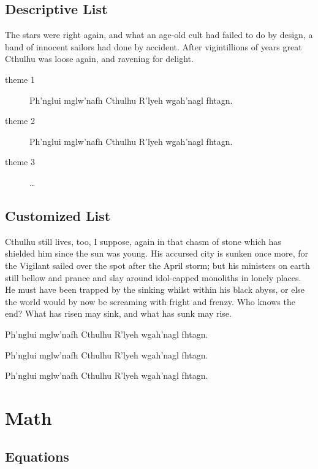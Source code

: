 \subsection{Descriptive List}

The stars were right again, and what an age-old cult had failed to do by design, a band of innocent sailors had done by accident. After vigintillions of years great Cthulhu was loose again, and ravening for delight. 

\begin{description}
    \item[theme 1] Ph'nglui mglw'nafh Cthulhu R'lyeh wgah'nagl fhtagn.
    \item[theme 2] Ph'nglui mglw'nafh Cthulhu R'lyeh wgah'nagl fhtagn.
    \item[theme 3] \ldots
\end{description}

\subsection{Customized List}

Cthulhu still lives, too, I suppose, again in that chasm of stone which has shielded him since the sun was young. His accursed city is sunken once more, for the Vigilant sailed over the spot after the April storm; but his ministers on earth still bellow and prance and slay around idol-capped monoliths in lonely places. He must have been trapped by the sinking whilst within his black abyss, or else the world would by now be screaming with fright and frenzy. Who knows the end? What has risen may sink, and what has sunk may rise. 

\begin{enumerate*}[label=\itshape\alph*)\upshape]
  \item Ph'nglui mglw'nafh Cthulhu R'lyeh wgah'nagl fhtagn.
  \item Ph'nglui mglw'nafh Cthulhu R'lyeh wgah'nagl fhtagn.
  \item Ph'nglui mglw'nafh Cthulhu R'lyeh wgah'nagl fhtagn.
\end{enumerate*}

\section{Math}
\label{sec:matheq}

\subsection{Equations}
\label{sec:eqformat}

